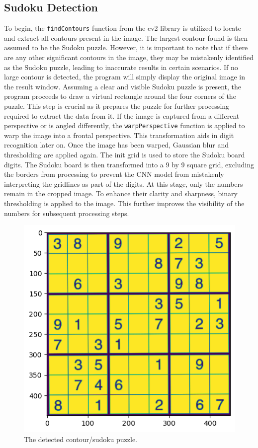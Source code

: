 \documentclass[conference]{IEEEtran}
\begin{document}
\subsection{Sudoku Detection}
To begin, the \verb|findContours| function from the cv2 library is utilized to locate and extract all contours present in the image. The largest contour found is then assumed to be the Sudoku puzzle. However, it is important to note that if there are any other significant contours in the image, they may be mistakenly identified as the Sudoku puzzle, leading to inaccurate results in certain scenarios. If no large contour is detected, the program will simply display the original image in the result window. Assuming a clear and visible Sudoku puzzle is present, the program proceeds to draw a virtual rectangle around the four corners of the puzzle. This step is crucial as it prepares the puzzle for further processing required to extract the data from it. If the image is captured from a different perspective or is angled differently, the \verb|warpPerspective| function is applied to warp the image into a frontal perspective. This transformation aids in digit recognition later on. Once the image has been warped, Gaussian blur and thresholding are applied again. The init grid is used to store the Sudoku board digits. The Sudoku board is then transformed into a 9 by 9 square grid, excluding the borders from processing to prevent the CNN model from mistakenly interpreting the gridlines as part of the digits. At this stage, only the numbers remain in the cropped image. To enhance their clarity and sharpness, binary thresholding is applied to the image. This further improves the visibility of the numbers for subsequent processing steps.

\begin{figure}[htbp]
\centerline{\includegraphics[scale=0.8]{assets/contour.png}}
\caption{The detected contour/sudoku puzzle.}
\label{contour_detection}
\end{figure}
\end{document}

